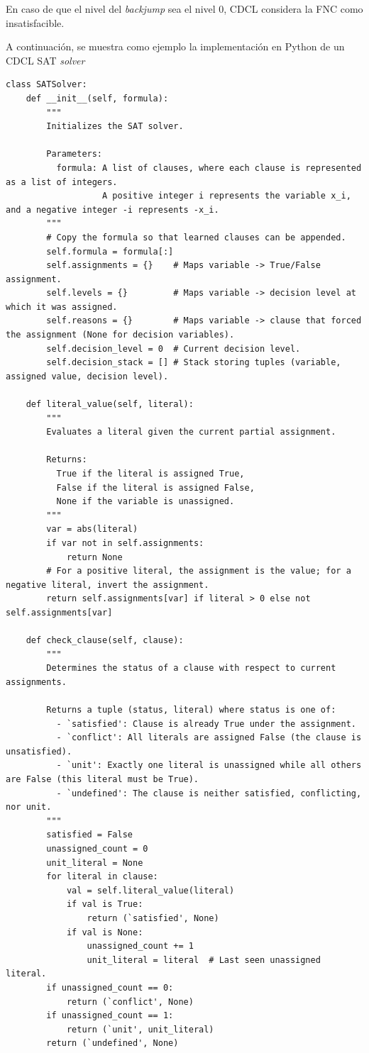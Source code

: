 En caso de que el nivel del \textit{backjump} sea el nivel 0, CDCL considera la FNC como insatisfacible.

A continuación, se muestra como ejemplo la implementación en Python de un CDCL SAT \textit{solver}

\begin{lstlisting}
class SATSolver:
    def __init__(self, formula):
        """
        Initializes the SAT solver.
        
        Parameters:
          formula: A list of clauses, where each clause is represented as a list of integers.
                   A positive integer i represents the variable x_i, and a negative integer -i represents -x_i.
        """
        # Copy the formula so that learned clauses can be appended.
        self.formula = formula[:]  
        self.assignments = {}    # Maps variable -> True/False assignment.
        self.levels = {}         # Maps variable -> decision level at which it was assigned.
        self.reasons = {}        # Maps variable -> clause that forced the assignment (None for decision variables).
        self.decision_level = 0  # Current decision level.
        self.decision_stack = [] # Stack storing tuples (variable, assigned value, decision level).

    def literal_value(self, literal):
        """
        Evaluates a literal given the current partial assignment.
        
        Returns:
          True if the literal is assigned True,
          False if the literal is assigned False,
          None if the variable is unassigned.
        """
        var = abs(literal)
        if var not in self.assignments:
            return None
        # For a positive literal, the assignment is the value; for a negative literal, invert the assignment.
        return self.assignments[var] if literal > 0 else not self.assignments[var]

    def check_clause(self, clause):
        """
        Determines the status of a clause with respect to current assignments.
        
        Returns a tuple (status, literal) where status is one of:
          - `satisfied': Clause is already True under the assignment.
          - `conflict': All literals are assigned False (the clause is unsatisfied).
          - `unit': Exactly one literal is unassigned while all others are False (this literal must be True).
          - `undefined': The clause is neither satisfied, conflicting, nor unit.
        """
        satisfied = False
        unassigned_count = 0
        unit_literal = None
        for literal in clause:
            val = self.literal_value(literal)
            if val is True:
                return (`satisfied', None)
            if val is None:
                unassigned_count += 1
                unit_literal = literal  # Last seen unassigned literal.
        if unassigned_count == 0:
            return (`conflict', None)
        if unassigned_count == 1:
            return (`unit', unit_literal)
        return (`undefined', None)


\end{lstlisting}
